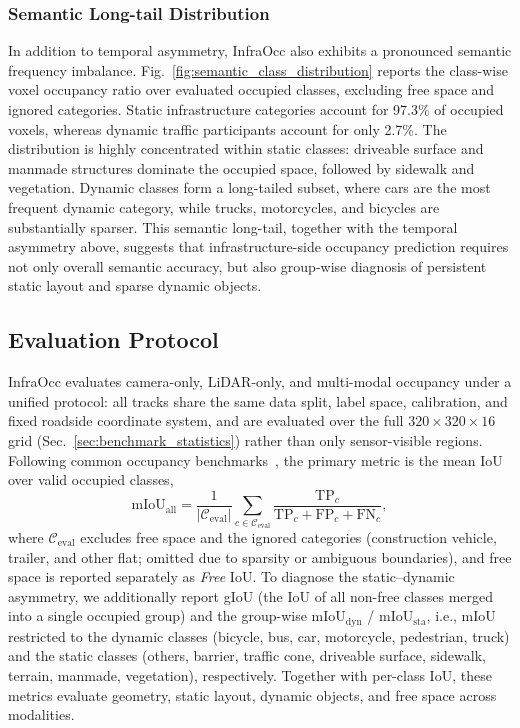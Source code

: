\subsubsection{Semantic Long-tail Distribution}
In addition to temporal asymmetry, InfraOcc also exhibits a pronounced semantic
frequency imbalance. Fig.~\ref{fig:semantic_class_distribution} reports the
class-wise voxel occupancy ratio over evaluated occupied classes, excluding
free space and ignored categories. Static infrastructure categories account for
97.3\% of occupied voxels, whereas dynamic traffic participants account for
only 2.7\%.
The distribution is highly concentrated within static classes: driveable
surface and manmade structures dominate the occupied space, followed by
sidewalk and vegetation. Dynamic classes form a long-tailed subset, where cars
are the most frequent dynamic category, while trucks, motorcycles, and bicycles
are substantially sparser. This semantic long-tail, together with the temporal
asymmetry above, suggests that infrastructure-side occupancy prediction requires
not only overall semantic accuracy, but also group-wise diagnosis of persistent
static layout and sparse dynamic objects.

\subsection{Evaluation Protocol}
\label{sec:benchmark_eval}

InfraOcc evaluates camera-only, LiDAR-only, and multi-modal occupancy under
a unified protocol: all tracks share the same data split, label space,
calibration, and fixed roadside coordinate system, and are evaluated over the
full $320\times320\times16$ grid (Sec.~\ref{sec:benchmark_statistics}) rather
than only sensor-visible regions. Following common occupancy
benchmarks~\cite{OpenOccupancy,Occ3D}, the primary metric is the mean IoU over
valid occupied classes,
\begin{equation}
  \mathrm{mIoU}_{\mathrm{all}}
  =
  \frac{1}{|\mathcal{C}_{\mathrm{eval}}|}
  \sum_{c\in\mathcal{C}_{\mathrm{eval}}}
  \frac{\mathrm{TP}_{c}}{\mathrm{TP}_{c}+\mathrm{FP}_{c}+\mathrm{FN}_{c}},
\end{equation}
where $\mathcal{C}_{\mathrm{eval}}$ excludes free space and the ignored
categories (construction vehicle, trailer, and other flat; omitted due to
sparsity or ambiguous boundaries), and free space is reported separately as
\textit{Free} IoU. To diagnose the static--dynamic asymmetry, we additionally
report gIoU (the IoU of all non-free classes merged into a single occupied
group) and the group-wise mIoU$_{\mathrm{dyn}}$ / mIoU$_{\mathrm{sta}}$, i.e.,
mIoU restricted to the dynamic classes (bicycle, bus, car, motorcycle,
pedestrian, truck) and the static classes (others, barrier, traffic cone,
driveable surface, sidewalk, terrain, manmade, vegetation), respectively.
Together with per-class IoU, these metrics evaluate geometry, static layout,
dynamic objects, and free space across modalities.
